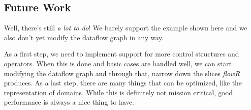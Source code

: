 \documentclass[color,coloraccent=red!60!black,listings]{poster}
\def\flowr{\textit{flowR}}
\begin{document}
\begin{multicols}{3}
	\section*{Future Work}
	Well, there's still \emph{a lot to do}! We barely support the example shown here and
	we also don't yet modify the dataflow graph in any way.\par As a first step, we need
	to implement support for more control structures and operators. When this is done
	and basic cases are handled well, we can start modifying the dataflow graph and
	through that, narrow down the slices \flowr{} produces. As a last step, there are
	many things that can be optimized, like the representation of domains. While this is
	definitely not mission critical, good performance is always a nice thing to have.
\end{multicols}
\end{document}
